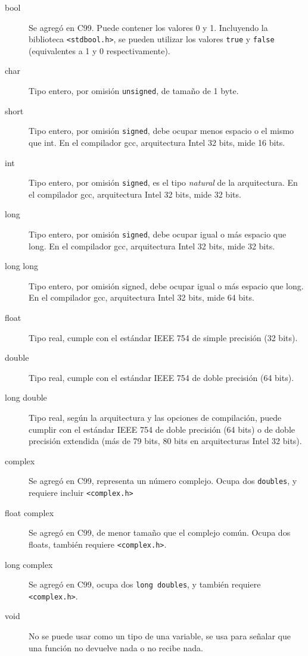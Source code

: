 \begin{description}
\item[bool]
 Se agregó en C99. Puede contener los valores 0 y 1. Incluyendo la biblioteca
\lstinline!<stdbool.h>!, se pueden utilizar los valores \lstinline!true! y
\lstinline!false! (equivalentes a 1 y 0 respectivamente).

\item[char]
 Tipo entero, por omisión \lstinline!unsigned!, de tamaño de 1 byte.

\item[short]
 Tipo entero, por omisión \lstinline!signed!, debe ocupar menos espacio o el
mismo que int. En el compilador gcc, arquitectura Intel 32 bits, mide 16 bits.

\item[int]
 Tipo entero, por omisión \lstinline!signed!, es el tipo \textit{natural} de la
 arquitectura. En el compilador gcc, arquitectura Intel 32 bits, mide 32 bits.

\item[long]
 Tipo entero, por omisión \lstinline!signed!, debe ocupar igual o más espacio
que long. En el compilador gcc, arquitectura Intel 32 bits, mide 32 bits.

\item[long long]
 Tipo entero, por omisión signed, debe ocupar igual o más espacio
 que long. En el compilador gcc, arquitectura Intel 32 bits, mide 64 bits.

\item[float]
 Tipo real, cumple con el estándar IEEE 754 de simple precisión (32 bits).

\item[double]
 Tipo real, cumple con el estándar IEEE 754 de doble precisión (64 bits).

\item[long double]
 Tipo real, según la arquitectura y las opciones de compilación, puede cumplir
con el estándar IEEE 754 de doble precisión (64 bits) o de doble precisión
extendida (más de 79 bits, 80 bits en arquitecturas Intel 32 bits).

\item[complex]
 Se agregó en C99, representa un número complejo.  Ocupa dos
\lstinline!doubles!, y requiere incluir \lstinline!<complex.h>!

\item[float complex]
 Se agregó en C99, de menor tamaño que el complejo
común. Ocupa dos floats, también requiere \lstinline!<complex.h>!.

\item[long complex]
 Se agregó en C99, ocupa dos \lstinline!long doubles!, y también requiere
\lstinline!<complex.h>!.

\item[void]
 No se puede usar como un tipo de una variable, se usa
 para señalar que una función no devuelve nada o no recibe nada.
\end{description}

